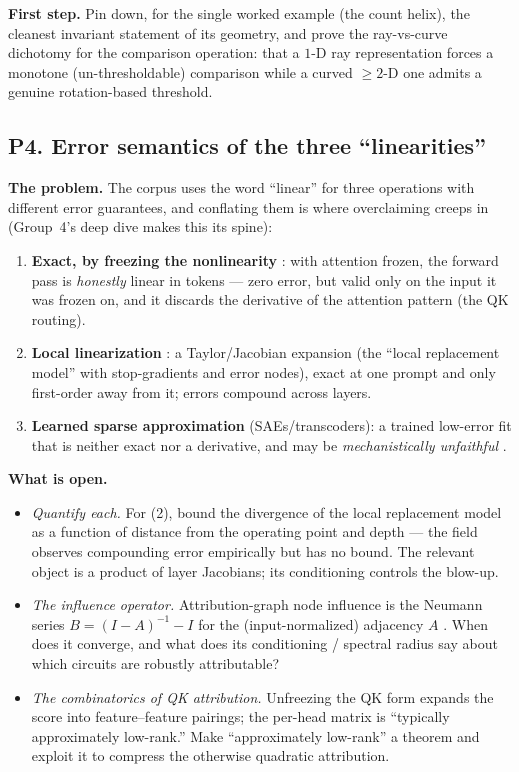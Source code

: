 \textbf{First step.} Pin down, for the single worked example (the count helix), the cleanest
invariant statement of its geometry, and prove the ray-vs-curve dichotomy for the comparison
operation: that a $1$-D ray representation forces a monotone (un-thresholdable) comparison while a
curved $\ge 2$-D one admits a genuine rotation-based threshold.

\subsection*{P4. Error semantics of the three ``linearities''}

\textbf{The problem.} The corpus uses the word ``linear'' for three operations with different error
guarantees, and conflating them is where overclaiming creeps in (Group~4's deep dive makes this
its spine):
\begin{enumerate}
\item \textbf{Exact, by freezing the nonlinearity} \parencite{framework}: with attention frozen,
  the forward pass is \emph{honestly} linear in tokens --- zero error, but valid only on the
  input it was frozen on, and it discards the derivative of the attention pattern (the QK
  routing).
\item \textbf{Local linearization} \parencite{circuit-tracing-computational-graphs}: a
  Taylor/Jacobian expansion (the ``local replacement model'' with stop-gradients and error
  nodes), exact at one prompt and only first-order away from it; errors compound across layers.
\item \textbf{Learned sparse approximation} (SAEs/transcoders): a trained low-error fit that is
  neither exact nor a derivative, and may be \emph{mechanistically unfaithful}
  \parencite{toy-model-of-mechanistic-unfaithfulness}.
\end{enumerate}

\textbf{What is open.}
\begin{itemize}
\item \emph{Quantify each.} For (2), bound the divergence of the local replacement model as a
  function of distance from the operating point and depth --- the field observes compounding
  error empirically but has no bound. The relevant object is a product of layer Jacobians; its
  conditioning controls the blow-up.
\item \emph{The influence operator.} Attribution-graph node influence is the Neumann series
  $B=(I-A)^{-1}-I$ for the (input-normalized) adjacency $A$
  \parencite{circuit-tracing-computational-graphs}. When does it converge, and what does its
  conditioning / spectral radius say about which circuits are robustly attributable?
\item \emph{The combinatorics of QK attribution.} Unfreezing the QK form
  \parencite{tracing-attention-feature-interactions,progress-on-attention} expands the score into
  feature--feature pairings; the per-head matrix is ``typically approximately low-rank.'' Make
  ``approximately low-rank'' a theorem and exploit it to compress the otherwise quadratic
  attribution.
\end{itemize}

